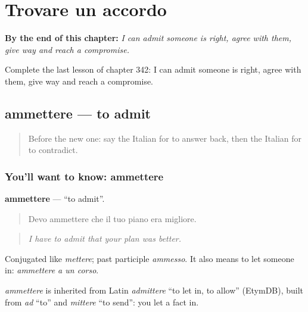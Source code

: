 
\chapter{Trovare un accordo}
\label{ch:it-trovare-un-accordo}

\begin{chapteropening}
\textbf{By the end of this chapter:} \emph{I can admit someone is right, agree with them, give way and reach a compromise.}

Complete the last lesson of chapter 342: I can admit someone is right, agree with them, give way and reach a compromise.
\end{chapteropening}

\section[ammettere]{ammettere — to admit}

\label{lesson:IT-C342-ammettere}



\begin{quote}
Before the new one: say the Italian for to answer back, then the Italian for to contradict.
\end{quote}

\subsection*{You'll want to know: ammettere}
\textbf{ammettere} — \textquotedblleft{}to admit\textquotedblright{}.

\begin{quote}
Devo ammettere che il tuo piano era migliore.
\end{quote}

\begin{quote}
\emph{I have to admit that your plan was better.}
\end{quote}

Conjugated like \emph{mettere}; past participle \emph{ammesso}. It also means to let someone in: \emph{ammettere a un corso}.

\begin{cousinweb}
\emph{ammettere} is inherited from Latin \emph{admittere} \textquotedblleft{}to let in, to allow\textquotedblright{} (EtymDB), built from \emph{ad} \textquotedblleft{}to\textquotedblright{} and \emph{mittere} \textquotedblleft{}to send\textquotedblright{}: you let a fact in.
\end{cousinweb}

